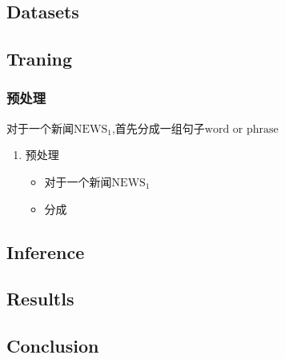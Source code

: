 \documentclass[]{article}
\numberwithin{equation}{subsection}
\begin{document}
	\subsection{Datasets}
	\subsection{Traning}
	\subsubsection{预处理}
	对于一个新闻$\text{NEWS}_1$,首先分成一组句子$\text{word or phrase}$
	\begin{enumerate}
		\item 预处理
			\begin{itemize}
				\item 对于一个新闻$\text{NEWS}_1$
				\item 分成
			\end{itemize}
	\end{enumerate}
	\subsection{Inference}
	\subsection{Resultls}
	\subsection{Conclusion}
	
	
\end{document}
